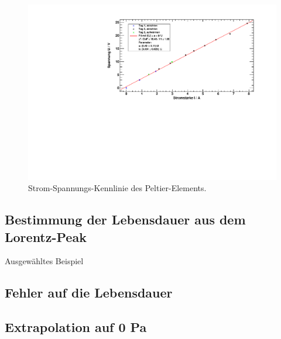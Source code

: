 \begin{figure}[H]
\begin{center}
  \includegraphics[width=\textwidth]{../img/graph_U-I.pdf}
  \caption{Strom-Spannungs-Kennlinie des Peltier-Elements.}
  \label{img:UI}
\end{center}
\end{figure}




\subsection{Bestimmung der Lebensdauer aus dem Lorentz-Peak}
Ausgewähltes Beispiel
\subsection{Fehler auf die Lebensdauer}
\subsection{Extrapolation auf 0 Pa}